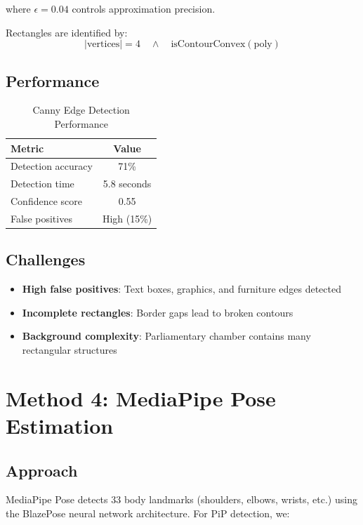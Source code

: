 \documentclass[11pt,a4paper]{article}
\begin{document}
where $\epsilon = 0.04$ controls approximation precision.

Rectangles are identified by:
\begin{equation}
|\text{vertices}| = 4 \quad \wedge \quad \text{isContourConvex}(\text{poly})
\end{equation}

\subsection{Performance}

\begin{table}[htbp]
\centering
\caption{Canny Edge Detection Performance}
\begin{tabular}{@{}lc@{}}
\toprule
\textbf{Metric} & \textbf{Value} \\ \midrule
Detection accuracy & 71\% \\
Detection time & 5.8 seconds \\
Confidence score & 0.55 \\
False positives & High (15\%) \\
\bottomrule
\end{tabular}
\end{table}

\subsection{Challenges}

\begin{itemize}
    \item \textbf{High false positives}: Text boxes, graphics, and furniture edges detected
    \item \textbf{Incomplete rectangles}: Border gaps lead to broken contours
    \item \textbf{Background complexity}: Parliamentary chamber contains many rectangular structures
\end{itemize}

\section{Method 4: MediaPipe Pose Estimation}

\subsection{Approach}

MediaPipe Pose detects 33 body landmarks (shoulders, elbows, wrists, etc.) using the BlazePose neural network architecture. For PiP detection, we:
\end{document}
